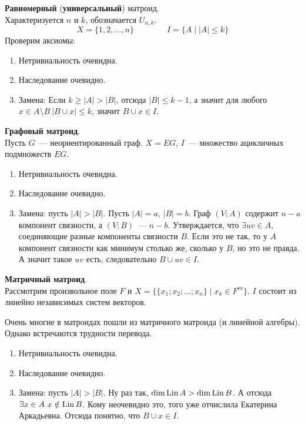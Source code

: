 \documentclass{article}
\begin{document}
    \begin{example}
        \textbf{Равномерный} (\textbf{универсальный}) матроид.\\
        Характеризуется $n$ и $k$, обозначается $U_{n,k}$.
        $$X=\{1,2,\ldots,n\}\qquad\qquad I=\{A\mid |A|\leqslant k\}$$
        Проверим аксиомы:
        \begin{enumerate}
            \item Нетривиальность очевидна.
            \item Наследование очевидно.
            \item Замена: Если $k\geqslant|A|>|B|$, отсюда $|B|\leqslant k-1$, а значит для любого $x\in A\setminus B~|B\cup x|\leqslant k$, значит $B\cup x\in I$.
        \end{enumerate}
    \end{example}
    \begin{example}
        \textbf{Графовый матроид}.\\
        Пусть $G$~--- неориентированный граф. $X=EG$, $I$~--- множество ацикличных подмножеств $EG$.
        \begin{enumerate}
            \item Нетривиальность очевидна.
            \item Наследование очевидно.
            \item Замена: пусть $|A|>|B|$. Пусть $|A|=a$, $|B|=b$. Граф $(V;A)$ содержит $n-a$ компонент связности, а $(V;B)$~--- $n-b$. Утверждается, что $\exists uv\in A$, соединяющие разные компоненты связности $B$. Если это не так, то у $A$ компонент связности как минимум столько же, сколько у $B$, но это не правда. А значит такое $uv$ есть, следовательно $B\cup uv\in I$.
        \end{enumerate}
    \end{example}
    \begin{example}
        \textbf{Матричный матроид}.\\
        Рассмотрим произвольное поле $F$ и $X=\{\{x_1;x_2;\ldots;x_n\}\mid x_k\in F^m\}$. $I$ состоит из линейно независимых систем векторов.
        \begin{remark}
            Очень многие в матроидах пошли из матричного матроида (и линейной алгебры). Однако встречаются трудности перевода.
        \end{remark}
        \begin{enumerate}
            \item Нетривиальность очевидна.
            \item Наследование очевидно.
            \item Замена: пусть $|A|>|B|$. Ну раз так, $\dim\operatorname{Lin} A>\dim\operatorname{Lin} B$. А отсюда $\exists x\in A~x\notin\operatorname{Lin} B$. Кому неочевидно это, того уже отчислила Екатерина Аркадьевна. Отсюда понятно, что $B\cup x\in I$.
        \end{enumerate}
    \end{example}
\end{document}

